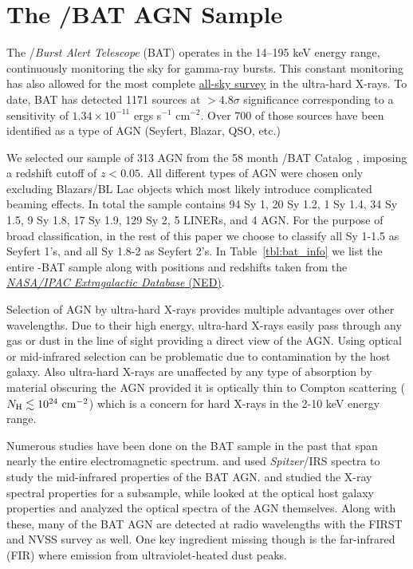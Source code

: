 \section{The \swift/BAT AGN Sample}\label{sample}
The  \swift/\textit{Burst Alert Telescope} (BAT) \cite{Barthelmy_2005,Gehrels_2004} operates in the 14--195 keV energy range, continuously monitoring the sky for gamma-ray bursts. This constant monitoring has also allowed for the most complete \href{https://swift.gsfc.nasa.gov/results/bs70mon/}{all-sky survey} in the ultra-hard X-rays. To date, BAT has detected 1171 sources at  $>4.8\sigma$ significance corresponding to a sensitivity of $1.34\times10^{-11}$ ergs s$^{-1}$ cm$^{-2}$. Over 700 of those sources have been identified as a type of AGN (Seyfert, Blazar, QSO, etc.)

We selected our sample of 313 AGN from the 58 month \swift/BAT Catalog \citep{Baumgartner:2012gf}, imposing a redshift cutoff of $z<0.05$. All different types of AGN were chosen only excluding Blazars/BL Lac objects which most likely introduce complicated beaming effects. In total the sample contains 94 Sy 1, 20 Sy 1.2, 1 Sy 1.4, 34 Sy 1.5, 9 Sy 1.8, 17 Sy 1.9, 129 Sy 2, 5 LINERs, and 4 AGN. For the purpose of broad classification, in the rest of this paper we choose to classify all Sy 1-1.5 as Seyfert 1's, and all Sy 1.8-2 as Seyfert 2's. In Table~\ref{tbl:bat_info} we list the entire \herschel{}-BAT sample along with positions and redshifts taken from the \href{http://ned.ipac.caltech.edu/}{\textit{NASA/IPAC Extragalactic Database} (NED)}.

Selection of AGN by ultra-hard X-rays provides multiple advantages over other wavelengths. Due to their high energy, ultra-hard X-rays easily pass through any gas or dust in the line of sight providing a direct view of the AGN. Using optical or mid-infrared selection can be problematic due to contamination by the host galaxy. Also ultra-hard X-rays are unaffected by any type of absorption by material obscuring the AGN provided it is optically thin to Compton scattering ($N_{\rm{H}} \lesssim 10^{24}\,\, \rm{cm}^{-2}$) which is a concern for hard X-rays in the 2-10 keV energy range.

Numerous studies have been done on the BAT sample in the past that span nearly the entire electromagnetic spectrum. \citet{Weaver:2010rt} and \citet{Melendez:2008pd} used \textit{Spitzer}/IRS spectra to study the mid-infrared properties of the BAT AGN. \cite{Winter:2009kx} and \cite{Vasudevan:2013dz} studied the X-ray spectral properties for a subsample, while \citet{Koss:2011vn} looked at the optical host galaxy properties and \citep{Winter:2010yq} analyzed the optical spectra of the AGN themselves. Along with these, many of the BAT AGN are detected at radio wavelengths with the FIRST \citep{Becker:1995lq} and NVSS \citep{Condon:1998eu} survey as well. One key ingredient missing though is the far-infrared (FIR) where emission from ultraviolet-heated dust peaks.